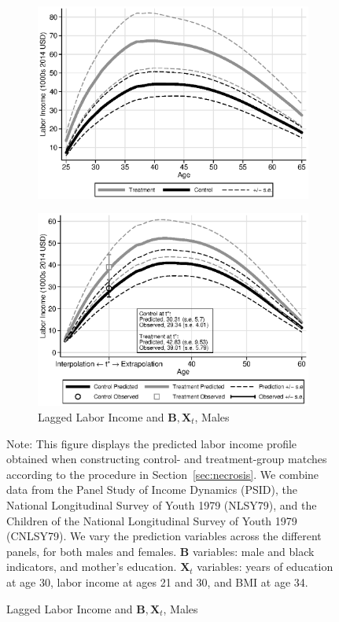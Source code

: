 \begin{figure}
\begin{subfigure}[h]{0.3\textwidth}
		\includegraphics[width=\textwidth]{output/labor_25-65_pset6_mset3_male.eps}
\end{subfigure}%
\begin{subfigure}[h]{0.3\textwidth}
	\centering
	\caption{Lagged Labor Income and $\bm{B}, \bm{X}_{t}$, Males}
		\includegraphics[width=\textwidth]{output/labor_25-65_pset1_mset3_male.eps}
\end{subfigure}
\footnotesize \justify
Note: This figure displays the predicted labor income profile obtained when constructing control- and treatment-group matches according to the procedure in Section~\ref{sec:necrosis}. We combine data from the Panel Study of Income Dynamics (PSID), the National Longitudinal Survey of Youth 1979 (NLSY79), and the Children of the National Longitudinal Survey of Youth 1979 (CNLSY79). We vary the prediction variables across the different panels, for both males and females. $\bm{B}$ variables: male and black indicators, and mother's education. $\bm{X}_{t}$ variables: years of education at age 30, labor income at ages 21 and 30, and BMI at age 34.
\end{figure}

